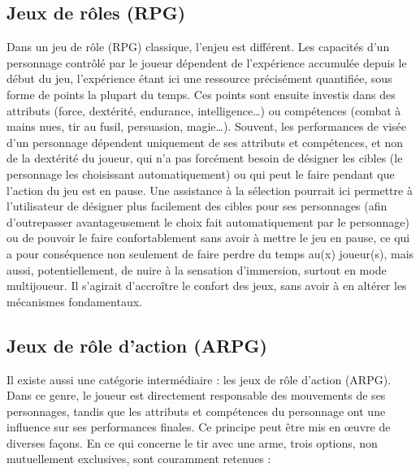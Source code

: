	\subsection{Jeux de rôles (RPG)}
	Dans un jeu de rôle (RPG) classique, l'enjeu est différent. Les capacités d'un personnage contrôlé par le joueur dépendent de l'expérience accumulée depuis le début du jeu, l'expérience étant ici une ressource précisément quantifiée, sous forme de points la plupart du temps. Ces points sont ensuite investis dans des attributs (force, dextérité, endurance, intelligence\ldots{}) ou compétences (combat à mains nues, tir au fusil, persuasion, magie\ldots{}). Souvent, les performances de visée d'un personnage dépendent uniquement de ses attributs et compétences, et non de la dextérité du joueur, qui n'a pas forcément besoin de désigner les cibles (le personnage les choisissant automatiquement) ou qui peut le faire pendant que l'action du jeu est en pause. Une assistance à la sélection pourrait ici permettre à l'utilisateur de désigner plus facilement des cibles pour ses personnages (afin d'outrepasser avantageusement le choix fait automatiquement par le personnage) ou de pouvoir le faire confortablement sans avoir à mettre le jeu en pause, ce qui a pour conséquence non seulement de faire perdre du temps au(x) joueur(s), mais aussi, potentiellement, de nuire à la sensation d'immersion, surtout en mode multijoueur. Il s'agirait d'accroître le confort des jeux, sans avoir à en altérer les mécanismes fondamentaux.
	
	\subsection{Jeux de rôle d'action (ARPG)}
	Il existe aussi une catégorie intermédiaire : les jeux de rôle d'action (ARPG). Dans ce genre, le joueur est directement responsable des mouvements de ses personnages, tandis que les attributs et compétences du personnage ont une influence sur ses performances finales. Ce principe peut être mis en œuvre de diverses façons. En ce qui concerne le tir avec une arme, trois options, non mutuellement exclusives, sont couramment retenues :
	
